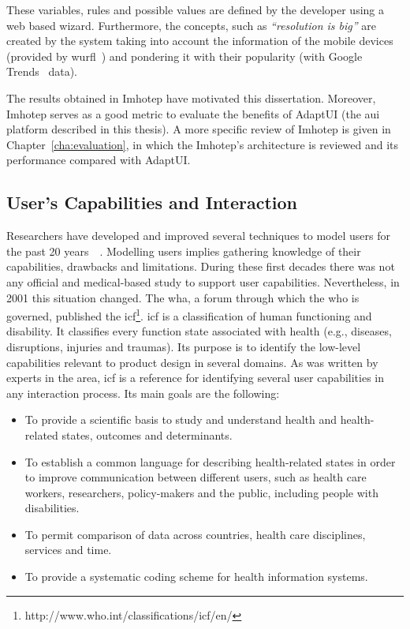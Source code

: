 \inputminted[linenos=true, fontsize=\footnotesize, frame=lines]{java}{5_experiments_and_results/imhotep_pseudocode.txt}

These variables, rules and possible values are defined by the developer using a
web based wizard. Furthermore, the concepts, such as \textit{``resolution is 
big''} are created by the system taking into account the information of the mobile
devices (provided by \ac{wurfl}~\citep{wurfl}) and pondering it with their 
popularity (with Google Trends~\citep{trends} data).

The results obtained in Imhotep have motivated this dissertation. Moreover, Imhotep
serves as a good metric to evaluate the benefits of AdaptUI (the \ac{aui} platform 
described in this thesis). A more specific review of Imhotep is given in 
Chapter~\ref{cha:evaluation}, in which the Imhotep's architecture is reviewed 
and its performance compared with AdaptUI.


\subsection{User's Capabilities and Interaction}
\label{sec:background_icf}

Researchers have developed and improved several techniques to model users for 
the past 20 years~\citep{petrelli_user_centered_1999}~\citep{fink_adaptable_1997}. 
Modelling users implies gathering knowledge of their capabilities, drawbacks 
and limitations. During these first decades there was not any official and 
medical-based study to support user capabilities. Nevertheless, in 2001 
this situation changed. The \ac{wha}, a forum through which the \ac{who} is
governed, published the \ac{icf}\footnote{http://www.who.int/classifications/icf/en/}. 
\ac{icf} is a classification of human functioning and disability. It 
classifies every function state associated with health (e.g., diseases, 
disruptions, injuries and traumas). Its purpose is to identify the low-level 
capabilities relevant to product design in several domains. As was written by 
experts in the area, \ac{icf} is a reference for identifying several user 
capabilities in any interaction process. Its main goals are the following:

\begin{itemize}
  \item To provide a scientific basis to study and understand health and
  health-related states, outcomes and determinants.
  \item To establish a common language for describing health-related states in 
  order to improve communication between different users, such as health care 
  workers, researchers, policy-makers and the public, including people with 
  disabilities.
  \item To permit comparison of data across countries, health care disciplines,
  services and time.
  \item To provide a systematic coding scheme for health information systems.
\end{itemize}

